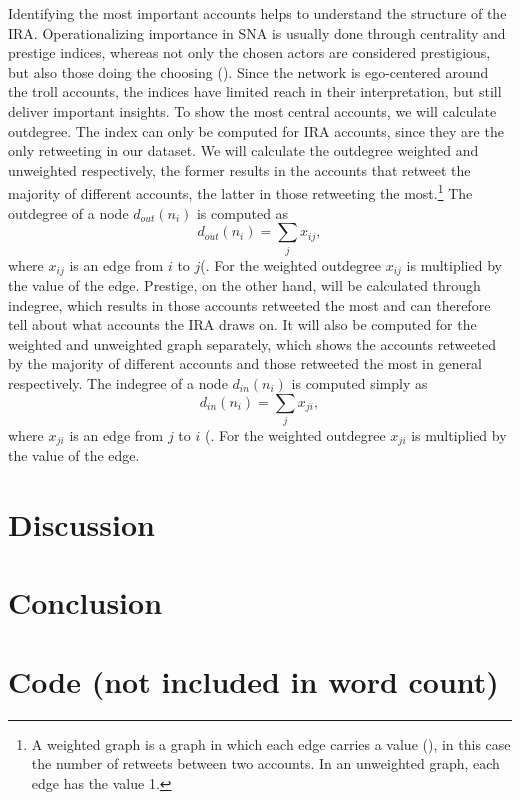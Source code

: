 \documentclass[12pt, titlepage=true, toc=bib]{scrartcl}
\begin{document}
Identifying the most important accounts helps to understand the structure of the IRA. Operationalizing importance in SNA is usually done through centrality and prestige indices, whereas not only the chosen actors are considered prestigious, but also those doing the choosing (\cite[170]{wasserman_social_1994}). Since the network is ego-centered around the troll accounts, the indices have limited reach in their interpretation, but still deliver important insights. To show the most central accounts, we will calculate outdegree. The index can only be computed for IRA accounts, since they are the only retweeting in our dataset. We will calculate the outdegree weighted and unweighted respectively, the former results in the accounts that retweet the majority of different accounts, the latter in those retweeting the most.\footnote{A weighted graph is a graph in which each edge carries a value (\cite[140]{wasserman_social_1994}), in this case the number of retweets between two accounts. In an unweighted graph, each edge has the value 1.} The outdegree of a node \( d_{out}(n_{i}) \) is computed as \[ d_{out}(n_{i}) = \sum_{j} x_{ij} ,\] where \( x_{ij} \) is an edge from \( i \) to \( j \)(\cite[cf.][178]{wasserman_social_1994}. For the weighted outdegree \( x_{ij} \) is multiplied by the value of the edge. Prestige, on the other hand, will be calculated through indegree, which results in those accounts retweeted the most and can therefore tell about what accounts the IRA draws on. It will also be computed for the weighted and unweighted graph separately, which shows the accounts retweeted by the majority of different accounts and those retweeted the most in general respectively. The indegree of a node \( d_{in}(n_{i}) \) is computed simply as \[ d_{in}(n_{i}) = \sum_{j} x_{ji} ,\] where \( x_{ji} \) is an edge from \( j \) to \( i \) (\cite[cf.][202]{wasserman_social_1994}. For the weighted outdegree \( x_{ji} \) is multiplied by the value of the edge.


\section{Discussion}

\section{Conclusion}

\section{Code (not included in word count)}



\newpage

\printbibliography
\end{document}
